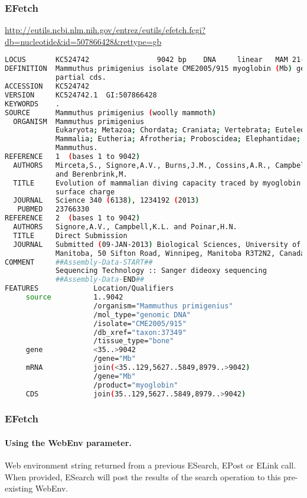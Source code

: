\documentclass{beamer}
\begin{document}
\begin{frame}[fragile]
\frametitle{EFetch}
\url{http://eutils.ncbi.nlm.nih.gov/entrez/eutils/efetch.fcgi?db=nucleotide&id=507866428&rettype=gb}
\begin{lstlisting}[language=bash,basicstyle=\tiny,breaklines=false]
LOCUS       KC524742                9042 bp    DNA     linear   MAM 21-JUN-2013
DEFINITION  Mammuthus primigenius isolate CME2005/915 myoglobin (Mb) gene,
            partial cds.
ACCESSION   KC524742
VERSION     KC524742.1  GI:507866428
KEYWORDS    .
SOURCE      Mammuthus primigenius (woolly mammoth)
  ORGANISM  Mammuthus primigenius
            Eukaryota; Metazoa; Chordata; Craniata; Vertebrata; Euteleostomi;
            Mammalia; Eutheria; Afrotheria; Proboscidea; Elephantidae;
            Mammuthus.
REFERENCE   1  (bases 1 to 9042)
  AUTHORS   Mirceta,S., Signore,A.V., Burns,J.M., Cossins,A.R., Campbell,K.L.
            and Berenbrink,M.
  TITLE     Evolution of mammalian diving capacity traced by myoglobin net
            surface charge
  JOURNAL   Science 340 (6138), 1234192 (2013)
   PUBMED   23766330
REFERENCE   2  (bases 1 to 9042)
  AUTHORS   Signore,A.V., Campbell,K.L. and Poinar,H.N.
  TITLE     Direct Submission
  JOURNAL   Submitted (09-JAN-2013) Biological Sciences, University of
            Manitoba, 50 Sifton Road, Winnipeg, Manitoba R3T2N2, Canada
COMMENT     ##Assembly-Data-START##
            Sequencing Technology :: Sanger dideoxy sequencing
            ##Assembly-Data-END##
FEATURES             Location/Qualifiers
     source          1..9042
                     /organism="Mammuthus primigenius"
                     /mol_type="genomic DNA"
                     /isolate="CME2005/915"
                     /db_xref="taxon:37349"
                     /tissue_type="bone"
     gene            <35..>9042
                     /gene="Mb"
     mRNA            join(<35..129,5627..5849,8979..>9042)
                     /gene="Mb"
                     /product="myoglobin"
     CDS             join(35..129,5627..5849,8979..>9042)

\end{lstlisting}
\end{frame}


\begin{frame}[fragile]
\frametitle{EFetch}
\framesubtitle{Using the WebEnv parameter.}
Web environment string returned from a previous ESearch, EPost or ELink call. When provided, ESearch will post the results of the search operation to this pre-existing WebEnv.
\end{frame}
\end{document}
